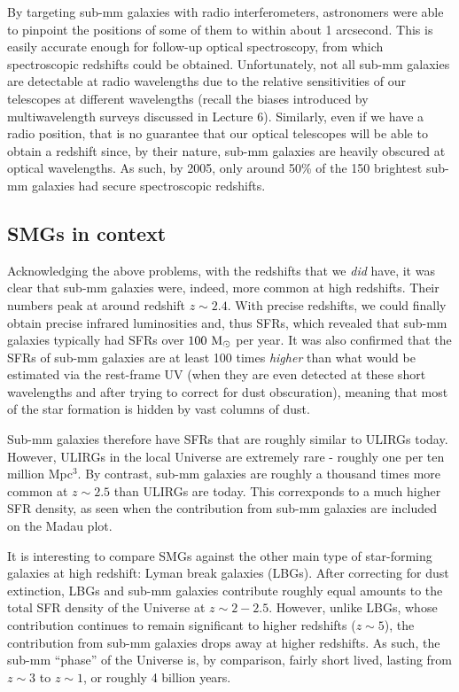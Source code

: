 \documentclass[11pt]{article}
\begin{document}
By targeting sub-mm galaxies with radio interferometers, astronomers
were able to pinpoint the positions of some of them to within about 1
arcsecond. This is easily accurate enough for follow-up optical
spectroscopy, from which spectroscopic redshifts could be
obtained. Unfortunately, not all sub-mm galaxies are detectable at
radio wavelengths due to the relative sensitivities of our telescopes
at different wavelengths (recall the biases introduced by
multiwavelength surveys discussed in Lecture 6). Similarly, even if we
have a radio position, that is no guarantee that our optical
telescopes will be able to obtain a redshift since, by their nature,
sub-mm galaxies are heavily obscured at optical wavelengths. As such,
by 2005, only around 50\% of the 150 brightest sub-mm galaxies had
secure spectroscopic redshifts.

\subsection{SMGs in context}

Acknowledging the above problems, with the redshifts that we {\it did}
have, it was clear that sub-mm galaxies were, indeed, more common at
high redshifts. Their numbers peak at around redshift $z\sim2.4$. With
precise redshifts, we could finally obtain precise infrared
luminosities and, thus SFRs, which revealed that sub-mm galaxies
typically had SFRs over ${\rm 100~M_\odot}$ per year. It was also
confirmed that the SFRs of sub-mm galaxies are at least 100 times {\it
  higher} than what would be estimated via the rest-frame UV (when
they are even detected at these short wavelengths and after trying to
correct for dust obscuration), meaning that most of the star formation
is hidden by vast columns of dust.

Sub-mm galaxies therefore have SFRs that are roughly similar to ULIRGs
today. However, ULIRGs in the local Universe are extremely rare -
roughly one per ten million Mpc$^3$. By contrast, sub-mm galaxies are
roughly a thousand times more common at $z\sim2.5$ than ULIRGs are
today. This correxponds to a much higher SFR density, as seen when the
contribution from sub-mm galaxies are included on the Madau plot.

It is interesting to compare SMGs against the other main type of
star-forming galaxies at high redshift: Lyman break galaxies
(LBGs). After correcting for dust extinction, LBGs and sub-mm galaxies
contribute roughly equal amounts to the total SFR density of the
Universe at $z\sim2-2.5$. However, unlike LBGs, whose contribution
continues to remain significant to higher redshifts ($z\sim5$), the
contribution from sub-mm galaxies drops away at higher redshifts. As
such, the sub-mm ``phase'' of the Universe is, by comparison, fairly
short lived, lasting from $z\sim3$ to $z\sim1$, or roughly 4 billion
years.
\end{document}
